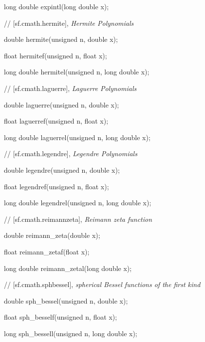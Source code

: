  long double expintl(long double x);

\vspace{2ex}
// [sf.cmath.hermite], {\it Hermite Polynomials}
\vspace{2ex}

 double hermite(unsigned n, double x);
	
 float hermitef(unsigned n, float x);
	
 long double hermitel(unsigned n, long double x);

\vspace{2ex}
// [sf.cmath.laguerre], {\it Laguerre Polynomials}
\vspace{2ex}

 double laguerre(unsigned n, double x);
	
 float laguerref(unsigned n, float x);
	
 long double laguerrel(unsigned n, long double x);

\vspace{2ex}
// [sf.cmath.legendre], {\it Legendre Polynomials}
\vspace{2ex}

 double legendre(unsigned n, double x);
	
 float legendref(unsigned n, float x);
	
 long double legendrel(unsigned n, long double x);

\vspace{2ex}
// [sf.cmath.reimann{\bigund}zeta], {\it Reimann zeta function}
\vspace{2ex}

 double reimann\_zeta(double x);
	
 float reimann\_zetaf(float x);
	
 long double reimann\_zetal(long double x);

\vspace{2ex}
// [sf.cmath.sph{\bigund}bessel], {\it spherical Bessel functions of the first kind}
\vspace{2ex}

 double sph\_bessel(unsigned n, double x);
	
 float sph\_besself(unsigned n, float x);
	
 long sph\_bessell(unsigned n, long double x);

